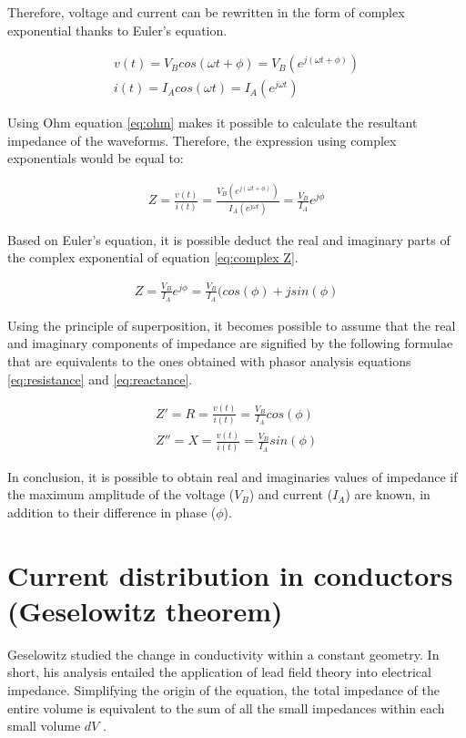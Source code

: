 Therefore, voltage and current can be rewritten in the form of complex exponential thanks to Euler's equation. 

\begin{align}
	\label{eq:volatge euler}
	v(t) = V_B cos(\omega t + \phi) = V_B(e^{j(\omega t + \phi)}) \\
	\label{eq:current euler}
	i(t) = I_A cos(\omega t) = I_A(e^{j\omega t})	
\end{align}

Using Ohm equation \ref{eq:ohm} makes it possible to calculate the resultant impedance of the waveforms. Therefore, the expression using complex exponentials would be equal to:

\begin{align}
	\label{eq:complex Z}
	Z = \frac{v(t)}{i(t)} = \frac{V_B(e^{j(\omega t + \phi)})}{I_A(e^{j\omega t})} = \frac{V_B}{I_A} e^{j\phi}
\end{align}

Based on Euler's equation, it is possible deduct the real and imaginary parts of the complex exponential of equation \ref{eq:complex Z}.

\begin{align}
	\label{eq:complex Z2}
	Z = \frac{V_B}{I_A} e^{j\phi} = \frac{V_B}{I_A}(cos(\phi) + j sin(\phi)
\end{align}

Using the principle of superposition, it becomes possible to assume that the real and imaginary components of impedance are signified by the following formulae that are equivalents to the ones obtained with phasor analysis equations	\ref{eq:resistance} and \ref{eq:reactance}.

\begin{align}
	\label{eq:R Z}
	Z' = R = \frac{v(t)}{i(t)} = \frac{V_B}{I_A}cos(\phi) \\
	\label{eq:X Z}
	Z'' = X = \frac{v(t)}{i(t)} = \frac{V_B}{I_A}sin(\phi)
\end{align}

In conclusion, it is possible to obtain real and imaginaries values of impedance if the maximum amplitude of the voltage ($V_B$) and current ($I_A$) are known, in addition to their difference in phase ($\phi$). 

\section{Current distribution in conductors (Geselowitz theorem)}  %
\label{section impedance Geselowitz}
Geselowitz \cite{geselowitz1971application} studied the change in conductivity within a constant geometry. In short, his analysis entailed the application of lead field theory into electrical impedance. Simplifying the origin of the equation, the total impedance of the entire volume is equivalent to the sum of all the small impedances within each small volume $dV$ \cite{martinsen2011bioimpedance}.

